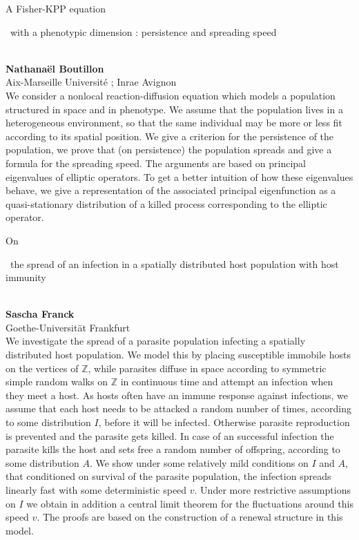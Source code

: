 \documentclass[12pt,a4paper]{article}
\newcommand{\ZAbst}{\rule[-1ex]{0pt}{2ex}\ } %
\begin{document}
\bigskip \bigskip  %
\newpage 

\noindent
{\Large A Fisher-KPP equation\ZAbst with a phenotypic dimension : persistence and spreading speed }\\[1ex]
{\large 
\textbf{Nathanaël Boutillon}\\[1ex] Aix-Marseille Université ; Inrae Avignon}\\[2ex]
We consider a nonlocal reaction-diffusion equation which models a population structured in space and in phenotype. We assume that the population lives in a heterogeneous environment, so that the same individual may be more or less fit according to its spatial position. We give a criterion for the persistence of the population, we prove that (on persistence) the population spreads and give a formula for the spreading speed. The arguments are based on principal eigenvalues of elliptic operators. To get a better intuition of how these eigenvalues behave, we give a representation of the associated principal eigenfunction as a quasi-stationary distribution of a killed process corresponding to the elliptic operator.



\bigskip \bigskip  %

\noindent
{\Large On\ZAbst the spread of an infection in a spatially distributed host population with host immunity}\\[1ex]
{\large 
\textbf{Sascha Franck}\\[1ex] Goethe-Universität Frankfurt}\\[2ex]
We investigate the spread of a parasite population infecting a spatially distributed host population. We model this by placing susceptible immobile hosts on the vertices of $\mathbb{Z}$, while parasites diffuse in space according to symmetric simple random walks on $\mathbb{Z}$ in continuous time and attempt an infection when they meet a host. As hosts often have an immune response against infections, we assume that each host needs to be attacked a random number of times, according to some distribution $I$, before it will be infected. Otherwise parasite reproduction is prevented and the parasite gets killed. In case of an successful infection the parasite kills the host and sets free a random number of offspring, according to some distribution $A$. We show under some relatively mild conditions on $I$ and $A$, that conditioned on survival of the parasite population, the infection spreads linearly fast with some deterministic speed $v$. Under more restrictive assumptions on $I$ we  obtain in addition a central limit theorem for the fluctuations around this speed $v$.
The proofs are based on the construction of a renewal structure in this model. 
\end{document}
